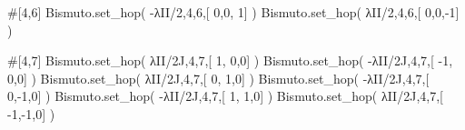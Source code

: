 \documentclass[
  letterpaper,
  DIV=11,
  numbers=noendperiod]{scrreprt}
\newenvironment{Shaded}{\begin{snugshade}}{\end{snugshade}}
\newcommand{\CommentTok}[1]{\textcolor[rgb]{0.37,0.37,0.37}{#1}}
\newcommand{\DecValTok}[1]{\textcolor[rgb]{0.68,0.00,0.00}{#1}}
\newcommand{\NormalTok}[1]{\textcolor[rgb]{0.00,0.23,0.31}{#1}}
\newcommand{\OperatorTok}[1]{\textcolor[rgb]{0.37,0.37,0.37}{#1}}
\newcommand{\OtherTok}[1]{\textcolor[rgb]{0.00,0.23,0.31}{#1}}
\begin{document}
\begin{Shaded}
\begin{Highlighting}[]
\CommentTok{\#[4,6]}
\NormalTok{Bismuto.set\_hop( }\OperatorTok{{-}}\NormalTok{λII}\OperatorTok{/}\DecValTok{2}\NormalTok{,}\DecValTok{4}\NormalTok{,}\DecValTok{6}\NormalTok{,[ }\DecValTok{0}\NormalTok{,}\DecValTok{0}\NormalTok{, }\DecValTok{1}\NormalTok{] ) }
\NormalTok{Bismuto.set\_hop(  λII}\OperatorTok{/}\DecValTok{2}\NormalTok{,}\DecValTok{4}\NormalTok{,}\DecValTok{6}\NormalTok{,[ }\DecValTok{0}\NormalTok{,}\DecValTok{0}\NormalTok{,}\OperatorTok{{-}}\DecValTok{1}\NormalTok{] ) }
\end{Highlighting}
\end{Shaded}

\begin{Shaded}
\begin{Highlighting}[]
\CommentTok{\#[4,7]}
\NormalTok{Bismuto.set\_hop(  λII}\OperatorTok{/}\OtherTok{2J}\NormalTok{,}\DecValTok{4}\NormalTok{,}\DecValTok{7}\NormalTok{,[  }\DecValTok{1}\NormalTok{, }\DecValTok{0}\NormalTok{,}\DecValTok{0}\NormalTok{] ) }
\NormalTok{Bismuto.set\_hop( }\OperatorTok{{-}}\NormalTok{λII}\OperatorTok{/}\OtherTok{2J}\NormalTok{,}\DecValTok{4}\NormalTok{,}\DecValTok{7}\NormalTok{,[ }\OperatorTok{{-}}\DecValTok{1}\NormalTok{, }\DecValTok{0}\NormalTok{,}\DecValTok{0}\NormalTok{] )}
\NormalTok{Bismuto.set\_hop(  λII}\OperatorTok{/}\OtherTok{2J}\NormalTok{,}\DecValTok{4}\NormalTok{,}\DecValTok{7}\NormalTok{,[  }\DecValTok{0}\NormalTok{, }\DecValTok{1}\NormalTok{,}\DecValTok{0}\NormalTok{] ) }
\NormalTok{Bismuto.set\_hop( }\OperatorTok{{-}}\NormalTok{λII}\OperatorTok{/}\OtherTok{2J}\NormalTok{,}\DecValTok{4}\NormalTok{,}\DecValTok{7}\NormalTok{,[  }\DecValTok{0}\NormalTok{,}\OperatorTok{{-}}\DecValTok{1}\NormalTok{,}\DecValTok{0}\NormalTok{] )}
\NormalTok{Bismuto.set\_hop( }\OperatorTok{{-}}\NormalTok{λII}\OperatorTok{/}\OtherTok{2J}\NormalTok{,}\DecValTok{4}\NormalTok{,}\DecValTok{7}\NormalTok{,[  }\DecValTok{1}\NormalTok{, }\DecValTok{1}\NormalTok{,}\DecValTok{0}\NormalTok{] ) }
\NormalTok{Bismuto.set\_hop(  λII}\OperatorTok{/}\OtherTok{2J}\NormalTok{,}\DecValTok{4}\NormalTok{,}\DecValTok{7}\NormalTok{,[ }\OperatorTok{{-}}\DecValTok{1}\NormalTok{,}\OperatorTok{{-}}\DecValTok{1}\NormalTok{,}\DecValTok{0}\NormalTok{] )}


\end{Highlighting}
\end{Shaded}
\end{document}
